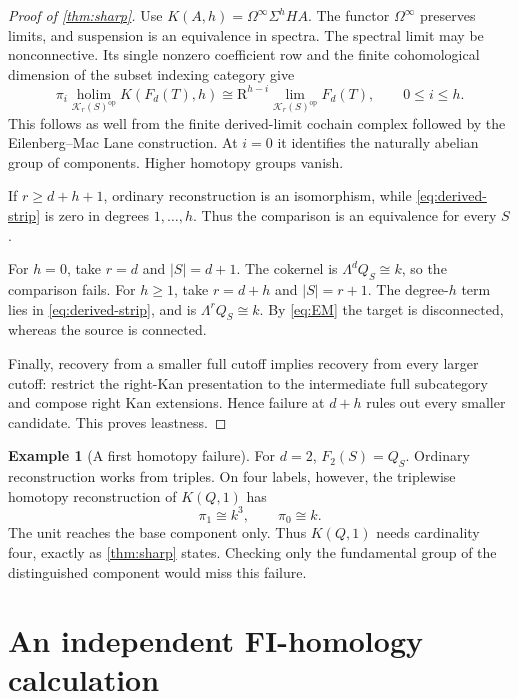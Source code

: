 \documentclass[11pt,a4paper]{article}
\theoremstyle{definition}
\newtheorem{example}[theorem]{Example}
\theoremstyle{remark}
\newcommand{\Kpos}{\mathcal K_r(S)}
\newcommand{\op}{\mathrm{op}}
\newcommand{\holim}{\operatorname*{holim}}
\newcommand{\limm}{\operatorname*{lim}}
\begin{document}
\begin{proof}[Proof of \cref{thm:sharp}]
Use $K(A,h)=\Omega^\infty\Sigma^hHA$. The functor $\Omega^\infty$ preserves limits, and suspension is an equivalence in spectra. The spectral limit may be nonconnective. Its single nonzero coefficient row and the finite cohomological dimension of the subset indexing category give
\begin{equation}\label{eq:EM}
 \pi_i\holim_{\Kpos^{\op}}K(F_d(T),h)
 \cong \mathrm R^{h-i}\limm_{\Kpos^{\op}}F_d(T),
 \qquad 0\le i\le h.
\end{equation}
This follows as well from the finite derived-limit cochain complex followed by the Eilenberg--Mac Lane construction. At $i=0$ it identifies the naturally abelian group of components. Higher homotopy groups vanish.

If $r\ge d+h+1$, ordinary reconstruction is an isomorphism, while \eqref{eq:derived-strip} is zero in degrees $1,\ldots,h$. Thus the comparison is an equivalence for every $S$.

For $h=0$, take $r=d$ and $|S|=d+1$. The cokernel is $\Lambda^dQ_S\cong k$, so the comparison fails. For $h\ge1$, take $r=d+h$ and $|S|=r+1$. The degree-$h$ term lies in \eqref{eq:derived-strip}, and is $\Lambda^rQ_S\cong k$. By \eqref{eq:EM} the target is disconnected, whereas the source is connected.

Finally, recovery from a smaller full cutoff implies recovery from every larger cutoff: restrict the right-Kan presentation to the intermediate full subcategory and compose right Kan extensions. Hence failure at $d+h$ rules out every smaller candidate. This proves leastness.
\end{proof}

\begin{example}[A first homotopy failure]
For $d=2$, $F_2(S)=Q_S$. Ordinary reconstruction works from triples. On four labels, however, the triplewise homotopy reconstruction of $K(Q,1)$ has
\[
 \pi_1\cong k^3,\qquad \pi_0\cong k.
\]
The unit reaches the base component only. Thus $K(Q,1)$ needs cardinality four, exactly as \cref{thm:sharp} states. Checking only the fundamental group of the distinguished component would miss this failure.
\end{example}

\section{An independent FI-homology calculation}
\end{document}
